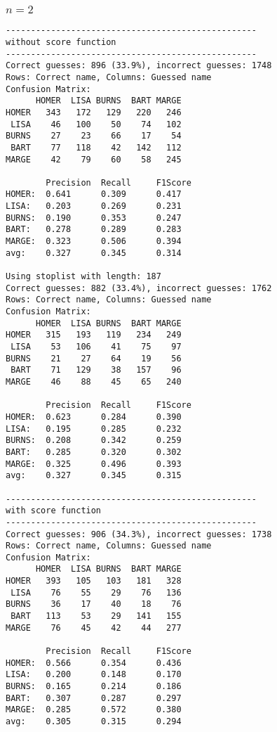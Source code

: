 \documentclass[a4paper]{article}
\begin{document}
\subsubsection{$n=2$}
\begin{verbatim}
--------------------------------------------------
without score function
--------------------------------------------------
Correct guesses: 896 (33.9%), incorrect guesses: 1748
Rows: Correct name, Columns: Guessed name
Confusion Matrix:
      HOMER  LISA BURNS  BART MARGE 
HOMER   343   172   129   220   246 
 LISA    46   100    50    74   102 
BURNS    27    23    66    17    54 
 BART    77   118    42   142   112 
MARGE    42    79    60    58   245 

        Precision  Recall     F1Score    
HOMER:  0.641      0.309      0.417      
LISA:   0.203      0.269      0.231      
BURNS:  0.190      0.353      0.247      
BART:   0.278      0.289      0.283      
MARGE:  0.323      0.506      0.394      
avg:    0.327      0.345      0.314      

Using stoplist with length: 187
Correct guesses: 882 (33.4%), incorrect guesses: 1762
Rows: Correct name, Columns: Guessed name
Confusion Matrix:
      HOMER  LISA BURNS  BART MARGE 
HOMER   315   193   119   234   249 
 LISA    53   106    41    75    97 
BURNS    21    27    64    19    56 
 BART    71   129    38   157    96 
MARGE    46    88    45    65   240 

        Precision  Recall     F1Score    
HOMER:  0.623      0.284      0.390      
LISA:   0.195      0.285      0.232      
BURNS:  0.208      0.342      0.259      
BART:   0.285      0.320      0.302      
MARGE:  0.325      0.496      0.393      
avg:    0.327      0.345      0.315      

--------------------------------------------------
with score function
--------------------------------------------------
Correct guesses: 906 (34.3%), incorrect guesses: 1738
Rows: Correct name, Columns: Guessed name
Confusion Matrix:
      HOMER  LISA BURNS  BART MARGE 
HOMER   393   105   103   181   328 
 LISA    76    55    29    76   136 
BURNS    36    17    40    18    76 
 BART   113    53    29   141   155 
MARGE    76    45    42    44   277 

        Precision  Recall     F1Score    
HOMER:  0.566      0.354      0.436      
LISA:   0.200      0.148      0.170      
BURNS:  0.165      0.214      0.186      
BART:   0.307      0.287      0.297      
MARGE:  0.285      0.572      0.380      
avg:    0.305      0.315      0.294      


\end{verbatim}
\end{document}
